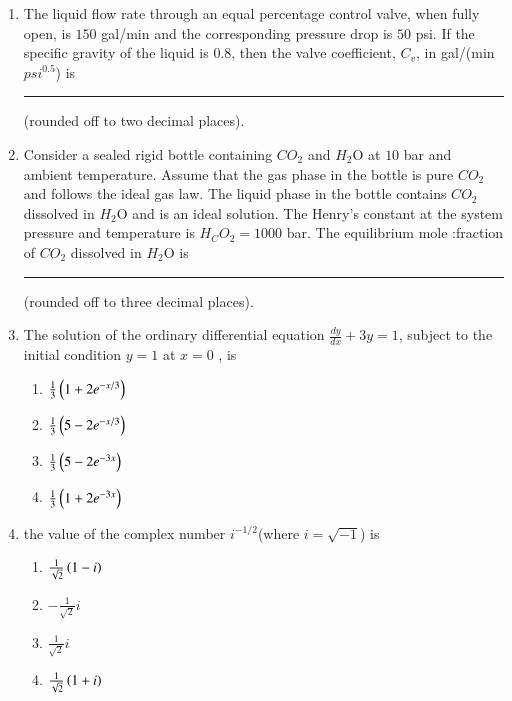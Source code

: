 \documentclass[journal,12pt,onecolumn]{IEEEtran}
\theoremstyle{remark}
\begin{document}
\begin{enumerate}
\item The liquid flow rate through an equal percentage control valve, when fully open, is $150$ gal/min and the corresponding pressure drop is $50$ psi. If the specific gravity of the liquid is $0.8$, then the valve coefficient, $C_v$, in gal/(min $psi^{0.5}$) is  \rule{1cm}{0.1mm} (rounded off to two decimal places).

 \hfill{}
    \item Consider a sealed rigid bottle containing $CO_2$ and $H_2$O at $10$ bar and ambient temperature. Assume that the gas phase in the bottle is pure $CO_2$ and follows the ideal gas law. The liquid phase in the bottle contains $CO_2$ dissolved in $H_2$O and is an ideal solution. The Henry's constant at the system pressure and temperature is $H_CO_2 = 1000$ bar. The equilibrium mole :fraction of $CO_2$ dissolved in $H_2$O is \rule{1cm}{0.1mm} (rounded off to three decimal places).   
    
 \hfill{}
    \item 
        The solution of the ordinary differential equation $\frac{dy}{dx} + 3y = 1$, subject to the initial condition $y = 1$ at $x = 0$ , is 
        
      \hfill{}
    
\begin{multicols}{2}
    \begin{enumerate}
        \item $\frac{1}{3}\left(1 + 2e^{-x/3}\right)$
        \item $\frac{1}{3}\left(5 - 2e^{-x/3}\right)$
        \item $\frac{1}{3}\left(5 - 2e^{-3x}\right)$
        \item $\frac{1}{3}\left(1 + 2e^{-3x}\right)$
    \end{enumerate}
\end{multicols}

    \item 
        the value of the complex number ${i}^{-1/2}$(where ${i} = \sqrt{-1}$) is
        
     \hfill{}

\begin{multicols}{4}
    \begin{enumerate}
    
    \item $\frac{1}{\sqrt{2}}\left(1 -i\right)$
    \item $-\frac{1}{\sqrt{2}}i$
    \item $\frac{1}{\sqrt{2}}i$
    \item $\frac{1}{\sqrt{2}}\left(1+i\right)$
    \end{enumerate}
\end{multicols}


\end{enumerate}
\end{document}

